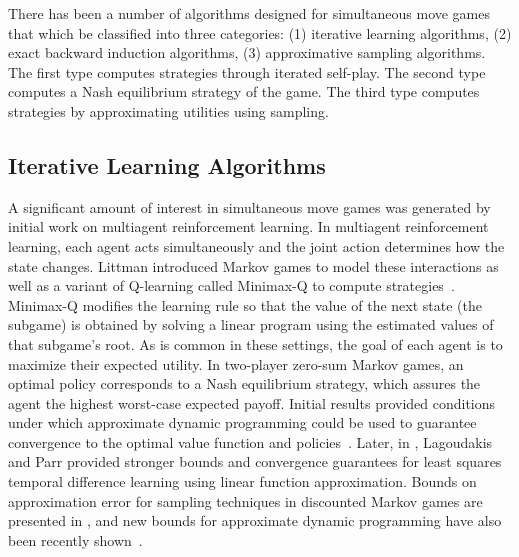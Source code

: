 There has been a number of algorithms designed for simultaneous move games that which be classified into three categories: 
(1) iterative learning algorithms, 
(2) exact backward induction algorithms, 
(3) approximative sampling algorithms.
The first type computes strategies through iterated self-play.
The second type computes a Nash equilibrium strategy of the game. 
The third type computes strategies by approximating utilities using sampling. 

\subsection{Iterative Learning Algorithms}



A significant amount of interest in simultaneous move games was generated by initial work 
on multiagent reinforcement learning. In multiagent reinforcement learning, each agent acts simultaneously and 
the joint action determines how the state changes. Littman introduced Markov games to model these interactions 
as well as a variant of Q-learning called Minimax-Q to compute strategies~\cite{Littman94markovgames,Littman01Value}.
Minimax-Q modifies the learning rule so that the value of the next state (the subgame) is obtained by solving
a linear program using the estimated values of that subgame's root.
As is common in these settings, the goal of each agent is to maximize their expected utility. 
In two-player zero-sum Markov games, an optimal policy corresponds to a Nash equilibrium strategy, which assures the agent 
the highest worst-case expected payoff. Initial results provided conditions under which approximate dynamic 
programming could be used to guarantee convergence to the optimal value function and 
policies~\cite{Littman96ageneralized}. Later, in \cite{Lagoudakis02}, Lagoudakis and Parr provided stronger bounds 
and convergence guarantees for least squares temporal difference learning using linear function approximation. 
Bounds on approximation error for sampling techniques in discounted Markov games are presented in \cite{Savagaonkar02}, 
and new bounds for approximate dynamic programming have also been recently shown~\cite{Perolat15Approximate}.

